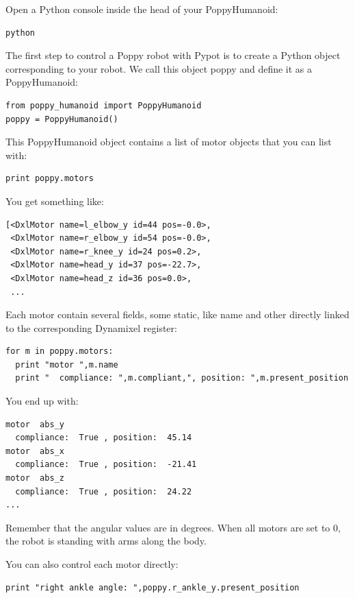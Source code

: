 \documentclass{article}
\begin{document}
Open a Python console inside the head of your PoppyHumanoid:

\begin{verbatim}
python
\end{verbatim}

The first step to control a Poppy robot with Pypot is to create a Python object corresponding to your robot. We call this object poppy and define it as a PoppyHumanoid:

\begin{verbatim}
from poppy_humanoid import PoppyHumanoid
poppy = PoppyHumanoid()
\end{verbatim}

This PoppyHumanoid object contains a list of motor objects that you can list with:

\begin{verbatim}
print poppy.motors
\end{verbatim}

You get something like:

\begin{verbatim}
[<DxlMotor name=l_elbow_y id=44 pos=-0.0>,
 <DxlMotor name=r_elbow_y id=54 pos=-0.0>,
 <DxlMotor name=r_knee_y id=24 pos=0.2>,
 <DxlMotor name=head_y id=37 pos=-22.7>,
 <DxlMotor name=head_z id=36 pos=0.0>,
 ...
\end{verbatim}

Each motor contain several fields, some static, like name and other directly linked to the corresponding Dynamixel register:

\begin{verbatim}
for m in poppy.motors:
  print "motor ",m.name
  print "  compliance: ",m.compliant,", position: ",m.present_position
\end{verbatim}

You end up with:

\begin{verbatim}
motor  abs_y
  compliance:  True , position:  45.14
motor  abs_x
  compliance:  True , position:  -21.41
motor  abs_z
  compliance:  True , position:  24.22
...
\end{verbatim}

Remember that the angular values are in degrees. When all motors are set to 0, the robot is standing with arms along the body.

You can also control each motor directly:

\begin{verbatim}
print "right ankle angle: ",poppy.r_ankle_y.present_position
\end{verbatim}
\end{document}
